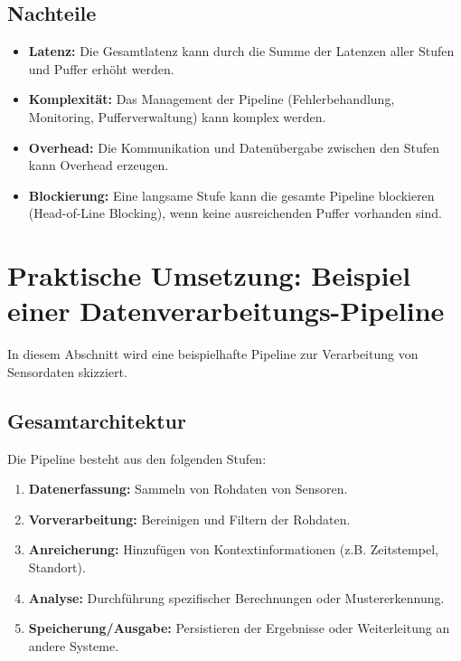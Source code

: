 \documentclass[a4paper]{article} %
\begin{document}
\subsection{Nachteile}
\begin{itemize}
    \item \textbf{Latenz:} Die Gesamtlatenz kann durch die Summe der Latenzen aller Stufen und Puffer erhöht werden.
    \item \textbf{Komplexität:} Das Management der Pipeline (Fehlerbehandlung, Monitoring, Pufferverwaltung) kann komplex werden.
    \item \textbf{Overhead:} Die Kommunikation und Datenübergabe zwischen den Stufen kann Overhead erzeugen.
    \item \textbf{Blockierung:} Eine langsame Stufe kann die gesamte Pipeline blockieren (Head-of-Line Blocking), wenn keine ausreichenden Puffer vorhanden sind.
\end{itemize}
\lipsum[6-7]

\section{Praktische Umsetzung: Beispiel einer Datenverarbeitungs-Pipeline}
In diesem Abschnitt wird eine beispielhafte Pipeline zur Verarbeitung von Sensordaten skizziert.
\subsection{Gesamtarchitektur}
Die Pipeline besteht aus den folgenden Stufen:
\begin{enumerate}
    \item \textbf{Datenerfassung:} Sammeln von Rohdaten von Sensoren.
    \item \textbf{Vorverarbeitung:} Bereinigen und Filtern der Rohdaten.
    \item \textbf{Anreicherung:} Hinzufügen von Kontextinformationen (z.B. Zeitstempel, Standort).
    \item \textbf{Analyse:} Durchführung spezifischer Berechnungen oder Mustererkennung.
    \item \textbf{Speicherung/Ausgabe:} Persistieren der Ergebnisse oder Weiterleitung an andere Systeme.
\end{enumerate}
\blindtext[3]
\lipsum[8-10]
\end{document}

